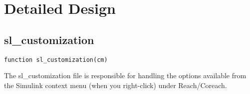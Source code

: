 \documentclass[12pt,letterpaper]{report}
\begin{document}
%	
	
%	
%	
%		
	
	\section{Detailed Design}
	
	\subsection{sl\_customization}
\begin{lstlisting}
function sl_customization(cm)
\end{lstlisting}
	The sl\_customization file is responsible for handling the options available from the Simulink context menu (when you right-click) under Reach/Coreach.
	
\end{document}
